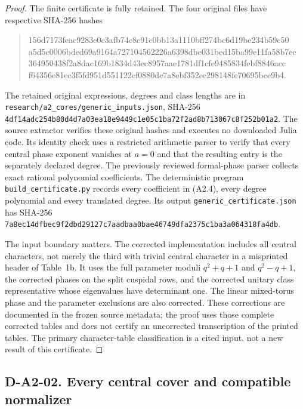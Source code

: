 \begin{proof}
The finite certificate is fully retained.  The four original files
have respective SHA-256 hashes
\begin{quote}\small\ttfamily
156d7173feac9283e0c3afb74c8c91c0bb13a1110bff274bc6d19be234b59c50\\
a5d5c0006bded69a9164a727104562226a6398dbe031bed15ba99e11fa58b7ec\\
364950438f2a8dac169b1834d43ec8957aae1781df1cfe9485834febf8846acc\\
f64356e81ec3f5fd951d551122cf0880dc7a8ebf352ec298148fe70695bce9b4.
\end{quote}
The retained original expressions, degrees and class lengths are in
\texttt{research/a2\_cores/generic\_inputs.json}, SHA-256
\texttt{4df14adc254b80d4d7a03ea18e9449c1e05c1ba72f2ad8b713067c8f252b01a2}.
The source extractor verifies these original hashes and executes
no downloaded Julia code.  Its identity check uses a restricted
arithmetic parser to verify that every central phase exponent
vanishes at $a=0$ and that the resulting entry is the separately
declared degree.  The previously reviewed formal-phase parser
collects exact rational polynomial coefficients.  The deterministic
program \texttt{build\_certificate.py} records every coefficient
in (A2.4), every degree polynomial and every translated degree.
Its output \texttt{generic\_certificate.json} has SHA-256
\texttt{7a8ec14dfbec9f2dbd29127c7aadbaa0bae46749dfa2375c1ba3a064318fa4db}.

The input boundary matters.  The corrected implementation includes
all central characters, not merely the third with trivial central
character in a misprinted header of Table~1b.  It uses the full
parameter moduli $q^2+q+1$ and $q^2-q+1$, the corrected phases on
the split cuspidal rows, and the corrected unitary class representative
whose eigenvalues have determinant one.  The linear mixed-torus
phase and the parameter exclusions are also corrected.  These
corrections are documented in the frozen source metadata; the
proof uses those complete corrected tables and does not certify an
uncorrected transcription of the printed tables.  The primary
character-table classification is a cited input, not a new result
of this certificate.
\end{proof}

\subsection*{D-A2-02. Every central cover and compatible normalizer}

